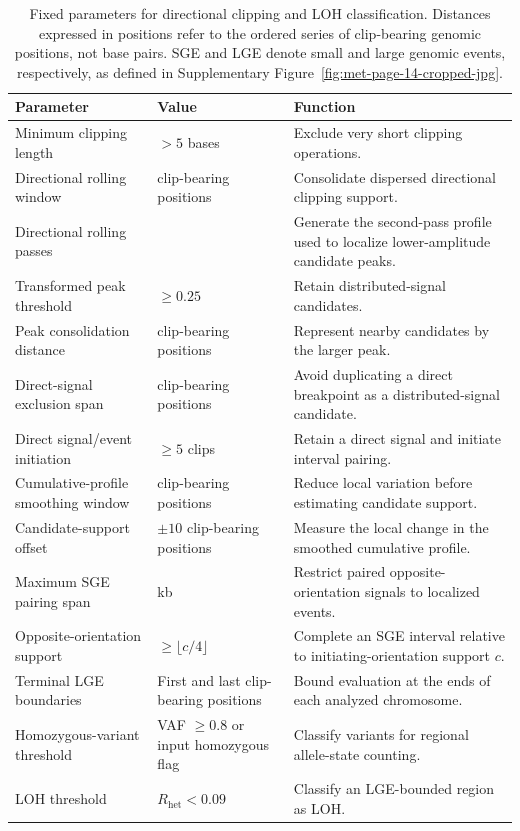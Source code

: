 \documentclass[pdflatex,sn-nature]{sn-jnl}
\begin{document}
\begin{table}[htbp]
  \centering
  \small
  \caption[Fixed parameters for clipping and LOH classification]%
  {Fixed parameters for directional clipping and LOH classification. Distances expressed in positions refer to the ordered series of clip-bearing genomic positions, not base pairs. SGE and LGE denote small and large genomic events, respectively, as defined in Supplementary Figure~\ref{fig:met-page-14-cropped-jpg}.}
  \label{tab:loh-clipping-parameters}
  \begin{tabularx}{\textwidth}{@{}>{\raggedright\arraybackslash}p{}>{\raggedright\arraybackslash}p{}X@{}}
    \toprule
    Parameter & Value & Function \\
    \midrule
    Minimum clipping length & \(>5\) bases & Exclude very short clipping operations. \\
    Directional rolling window & 100 clip-bearing positions & Consolidate dispersed directional clipping support. \\
    Directional rolling passes & 2 & Generate the second-pass profile used to localize lower-amplitude candidate peaks. \\
    Transformed peak threshold & \(\geq0.25\) & Retain distributed-signal candidates. \\
    Peak consolidation distance & 100 clip-bearing positions & Represent nearby candidates by the larger peak. \\
    Direct-signal exclusion span & 200 clip-bearing positions & Avoid duplicating a direct breakpoint as a distributed-signal candidate. \\
    Direct signal/event initiation & \(\geq5\) clips & Retain a direct signal and initiate interval pairing. \\
    Cumulative-profile smoothing window & 100 clip-bearing positions & Reduce local variation before estimating candidate support. \\
    Candidate-support offset & \(\pm10\) clip-bearing positions & Measure the local change in the smoothed cumulative profile. \\
    Maximum SGE pairing span & 10 kb & Restrict paired opposite-orientation signals to localized events. \\
    Opposite-orientation support & \(\geq\lfloor c/4\rfloor\) & Complete an SGE interval relative to initiating-orientation support \(c\). \\
    Terminal LGE boundaries & First and last clip-bearing positions & Bound evaluation at the ends of each analyzed chromosome. \\
    Homozygous-variant threshold & VAF \(\geq0.8\) or input homozygous flag & Classify variants for regional allele-state counting. \\
    LOH threshold & \(R_{\mathrm{het}}<0.09\) & Classify an LGE-bounded region as LOH. \\
    \bottomrule
  \end{tabularx}
\end{table}
\end{document}
